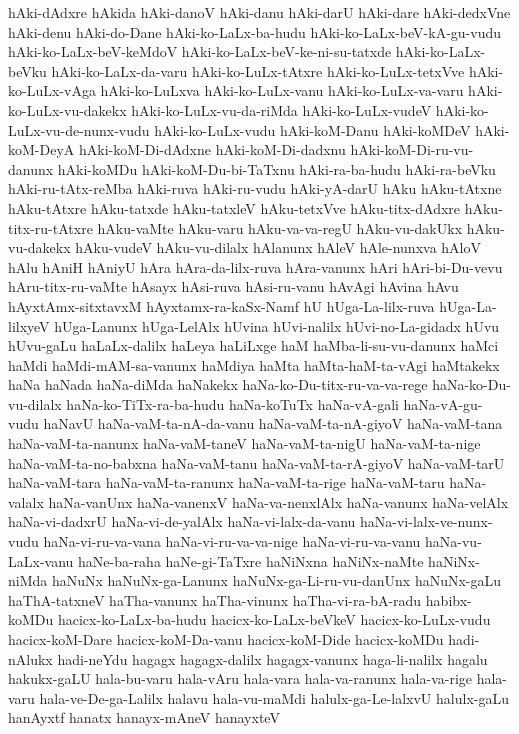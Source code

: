 {hAki-dAdxre
hAkida
hAki-danoV
hAki-danu
hAki-darU
hAki-dare
hAki-dedxVne
hAki-denu
hAki-do-Dane
hAki-ko-LaLx-ba-hudu
hAki-ko-LaLx-beV-kA-gu-vudu
hAki-ko-LaLx-beV-keMdoV
hAki-ko-LaLx-beV-ke-ni-su-tatxde
hAki-ko-LaLx-beVku
hAki-ko-LaLx-da-varu
hAki-ko-LuLx-tAtxre
hAki-ko-LuLx-tetxVve
hAki-ko-LuLx-vAga
hAki-ko-LuLxva
hAki-ko-LuLx-vanu
hAki-ko-LuLx-va-varu
hAki-ko-LuLx-vu-dakekx
hAki-ko-LuLx-vu-da-riMda
hAki-ko-LuLx-vudeV
hAki-ko-LuLx-vu-de-nunx-vudu
hAki-ko-LuLx-vudu
hAki-koM-Danu
hAki-koMDeV
hAki-koM-DeyA
hAki-koM-Di-dAdxne
hAki-koM-Di-dadxnu
hAki-koM-Di-ru-vu-danunx
hAki-koMDu
hAki-koM-Du-bi-TaTxnu
hAki-ra-ba-hudu
hAki-ra-beVku
hAki-ru-tAtx-reMba
hAki-ruva
hAki-ru-vudu
hAki-yA-darU
hAku
hAku-tAtxne
hAku-tAtxre
hAku-tatxde
hAku-tatxleV
hAku-tetxVve
hAku-titx-dAdxre
hAku-titx-ru-tAtxre
hAku-vaMte
hAku-varu
hAku-va-va-regU
hAku-vu-dakUkx
hAku-vu-dakekx
hAku-vudeV
hAku-vu-dilalx
hAlanunx
hAleV
hAle-nunxva
hAloV
hAlu
hAniH
hAniyU
hAra
hAra-da-lilx-ruva
hAra-vanunx
hAri
hAri-bi-Du-vevu
hAru-titx-ru-vaMte
hAsayx
hAsi-ruva
hAsi-ru-vanu
hAvAgi
hAvina
hAvu
hAyxtAmx-sitxtavxM
hAyxtamx-ra-kaSx-Namf
hU
hUga-La-lilx-ruva
hUga-La-lilxyeV
hUga-Lanunx
hUga-LelAlx
hUvina
hUvi-nalilx
hUvi-no-La-gidadx
hUvu
hUvu-gaLu
haLaLx-dalilx
haLeya
haLiLxge
haM
haMba-li-su-vu-danunx
haMci
haMdi
haMdi-mAM-sa-vanunx
haMdiya
haMta
haMta-haM-ta-vAgi
haMtakekx
haNa
haNada
haNa-diMda
haNakekx
haNa-ko-Du-titx-ru-va-va-rege
haNa-ko-Du-vu-dilalx
haNa-ko-TiTx-ra-ba-hudu
haNa-koTuTx
haNa-vA-gali
haNa-vA-gu-vudu
haNavU
haNa-vaM-ta-nA-da-vanu
haNa-vaM-ta-nA-giyoV
haNa-vaM-tana
haNa-vaM-ta-nanunx
haNa-vaM-taneV
haNa-vaM-ta-nigU
haNa-vaM-ta-nige
haNa-vaM-ta-no-babxna
haNa-vaM-tanu
haNa-vaM-ta-rA-giyoV
haNa-vaM-tarU
haNa-vaM-tara
haNa-vaM-ta-ranunx
haNa-vaM-ta-rige
haNa-vaM-taru
haNa-valalx
haNa-vanUnx
haNa-vanenxV
haNa-va-nenxlAlx
haNa-vanunx
haNa-velAlx
haNa-vi-dadxrU
haNa-vi-de-yalAlx
haNa-vi-lalx-da-vanu
haNa-vi-lalx-ve-nunx-vudu
haNa-vi-ru-va-vana
haNa-vi-ru-va-va-nige
haNa-vi-ru-va-vanu
haNa-vu-LaLx-vanu
haNe-ba-raha
haNe-gi-TaTxre
haNiNxna
haNiNx-naMte
haNiNx-niMda
haNuNx
haNuNx-ga-Lanunx
haNuNx-ga-Li-ru-vu-danUnx
haNuNx-gaLu
haThA-tatxneV
haTha-vanunx
haTha-vinunx
haTha-vi-ra-bA-radu
habibx-koMDu
hacicx-ko-LaLx-ba-hudu
hacicx-ko-LaLx-beVkeV
hacicx-ko-LuLx-vudu
hacicx-koM-Dare
hacicx-koM-Da-vanu
hacicx-koM-Dide
hacicx-koMDu
hadi-nAlukx
hadi-neYdu
hagagx
hagagx-dalilx
hagagx-vanunx
haga-li-nalilx
hagalu
hakukx-gaLU
hala-bu-varu
hala-vAru
hala-vara
hala-va-ranunx
hala-va-rige
hala-varu
hala-ve-De-ga-Lalilx
halavu
hala-vu-maMdi
halulx-ga-Le-lalxvU
halulx-gaLu
hanAyxtf
hanatx
hanayx-mAneV
hanayxteV
}
